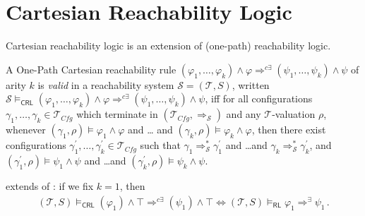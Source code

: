 \documentclass{article}
\newcommand{\RL}{\mathsf{RL}}
\newcommand{\CRL}{\mathsf{CRL}}
\newcommand{\Tcfg}{\mathcal{T}_{\mathit{Cfg}}}
\begin{document}
\section{Cartesian Reachability Logic}
Cartesian reachability logic is an extension of (one-path) reachability logic.

\begin{definition}\label{def:opCRLsemantics}
A One-Path Cartesian reachability rule
$(\varphi_1,\ldots,\varphi_k) \land \varphi \Rightarrow^{c\exists} (\psi_1,\ldots,\psi_k) \land \psi$
of arity $k$
is \emph{valid} in a reachability system $\mathcal{S} = (\mathcal{T}, S)$,
written
$\mathcal{S} \vDash_\CRL (\varphi_1,\ldots,\varphi_k) \land \varphi \Rightarrow^{c\exists}
(\psi_1,\ldots,\psi_k) \land \psi$,
iff for all configurations $\gamma_1,\ldots,\gamma_k \in \Tcfg$
which terminate in $(\Tcfg, \Rightarrow_{\mathcal{S}})$
and any $\mathcal{T}$-valuation $\rho$,
whenever $(\gamma_1,\rho) \vDash \varphi_1 \land \varphi$ and \ldots
and $(\gamma_k,\rho) \vDash \varphi_k \land \varphi$,
then there exist configurations $\gamma_1^\prime,\ldots,\gamma_k^\prime \in \Tcfg$
such that $\gamma_1 \Rightarrow^{*}_{\mathcal{S}} \gamma_1^\prime$
and \ldots and $\gamma_k \Rightarrow^{*}_{\mathcal{S}} \gamma_k^\prime$,
and
$(\gamma_1^\prime,\rho) \vDash \psi_1 \land \psi$ and \ldots and $(\gamma_k^\prime, \rho) \vDash \psi_k \land \psi$.
\end{definition}


\begin{remark}
 extends  of :
if we fix $k=1$, then
\begin{align*}
    (\mathcal{T}, S) \vDash_\CRL
    (\varphi_1) \land \top  \Rightarrow^{c\exists}
    (\psi_1) \land \top
    \iff
    (\mathcal{T}, S) \vDash_\RL \varphi_1 \Rightarrow^{\exists} \psi_1 \, .
\end{align*}
\end{remark}
\end{document}
